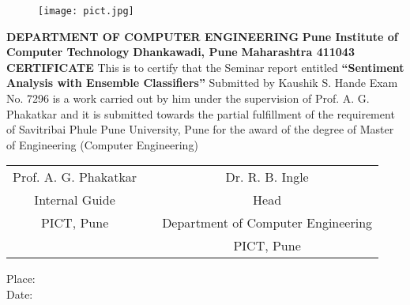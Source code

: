 \documentclass[10pt]{article}
\begin{document}
\begin{titlepage}
\begin{center}

\begin{figure}[ht!]
\begin{center}
\texttt{[image: pict.jpg]}
\end{center}
\label{overflow}
\end{figure}

\textbf{\linebreak \large{DEPARTMENT OF COMPUTER ENGINEERING}}
\linebreak
\linebreak
\textbf{Pune Institute of Computer Technology}
\linebreak
\textbf{Dhankawadi, Pune}
\linebreak
\textbf{Maharashtra 411043}
\linebreak
\linebreak
\textbf{\Large{CERTIFICATE}}
\linebreak
\linebreak
\linebreak
 This is to certify that the Seminar report entitled
\linebreak
\textbf{“Sentiment Analysis with Ensemble Classifiers”}
\linebreak
\linebreak
Submitted by
\linebreak
Kaushik S. Hande \hspace{10mm}   Exam No. 7296 \linebreak
\linebreak
is a work carried out by him under the supervision of Prof. A. G. Phakatkar and it is submitted towards the partial fulfillment of the requirement of Savitribai Phule Pune University, Pune for the award of the degree of Master of Engineering (Computer Engineering)
\linebreak
\linebreak
\linebreak
\linebreak
\linebreak
\begin{table}[h]
\begin{tabular}{ccc}
Prof. A. G. Phakatkar    &                        &  \hspace{52mm} Dr. R. B. Ingle\\
Internal Guide      &                     &    \hspace{52mm} Head \\
PICT, Pune          &                         &       \hspace{47mm} Department of Computer Engineering \\
                    &                       & \hspace{52mm} PICT, Pune
\end{tabular}
\end{table}
\end{center}
Place:\\ 
Date:
\end{titlepage}
\end{document}
